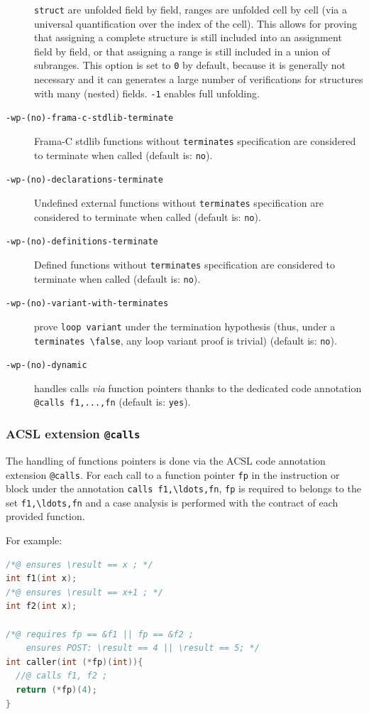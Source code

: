 \begin{description}
  \texttt{struct} are unfolded field by field, ranges are unfolded cell by
  cell (via a universal quantification over the index of the cell).
  This allows for proving that assigning a complete structure is still included
  into an assignment field by field, or that assigning a range is still included
  in a union of subranges. This option is set to \texttt{0} by default, because
  it is generally not necessary and it can generates a large number of
  verifications for structures with many (nested) fields. \texttt{-1} enables
  full unfolding.
\item[\tt -wp-(no)-frama-c-stdlib-terminate] Frama-C stdlib functions without
  \texttt{terminates} specification are considered to terminate when called
  (default is: \texttt{no}).
\item[\tt -wp-(no)-declarations-terminate] Undefined external functions without
  \texttt{terminates} specification are considered to terminate when called
  (default is: \texttt{no}).
\item[\tt -wp-(no)-definitions-terminate] Defined functions without
  \texttt{terminates} specification are considered to terminate when called
  (default is: \texttt{no}).
\item[\tt -wp-(no)-variant-with-terminates] prove \texttt{loop variant} under
  the termination hypothesis (thus, under a
  \texttt{terminates \textbackslash{}false}, any loop variant proof is trivial)
  (default is: \texttt{no}).
\item[\tt -wp-(no)-dynamic] handles calls \textit{via} function pointers
  thanks to the dedicated code annotation \verb+@calls f1,...,fn+ (default is: \texttt{yes}).
\end{description}

\subsubsection{ACSL extension \texttt{@calls}}
\label{acsl:calls}

The handling of functions pointers is done via the ACSL code annotation
extension \verb+@calls+. For each call to a function pointer \verb+fp+
in the instruction or block under the annotation \verb+calls f1,\ldots,fn+,
\verb+fp+ is required to belongs to the set \verb+f1,\ldots,fn+ and
a case analysis is performed with the contract of each provided function.

For example:

\begin{lstlisting}[language=c, alsolanguage=acsl]
/*@ ensures \result == x ; */
int f1(int x);
/*@ ensures \result == x+1 ; */
int f2(int x);

/*@ requires fp == &f1 || fp == &f2 ;
    ensures POST: \result == 4 || \result == 5; */
int caller(int (*fp)(int)){
  //@ calls f1, f2 ;
  return (*fp)(4);
}
\end{lstlisting}


